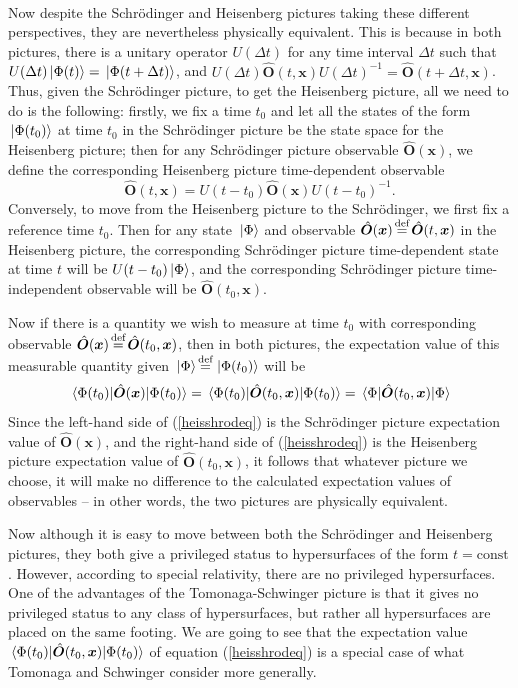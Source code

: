 \strut \\[\baselineskip] 
Now despite the Schr\"{o}dinger and Heisenberg pictures taking these different perspectives, they are nevertheless physically equivalent. This is because in both pictures, there is a unitary operator $U(\Delta t)$ for any time interval $\Delta t$ such that $U(\Delta t)\ket*{\Phi(t)}=\ket*{\Phi(t+\Delta t)}$, and $U(\Delta t)\hat{\bm{O}}(t, \bm{x})U(\Delta t)^{-1}=\hat{\bm{O}}(t+\Delta t, \bm{x})$. Thus, given the Schr\"{o}dinger picture, to get the Heisenberg picture, all we need to do is the following: firstly, we fix a time $t_0$ and let all the states of the form $\ket*{\Phi(t_0)}$ at time $t_0$ in the Schr\"{o}dinger picture be the state space for the Heisenberg picture; then for any Schr\"{o}dinger picture observable $\hat{\bm{O}}(\bm{x})$, we define the corresponding Heisenberg picture time-dependent observable 
$$\hat{\bm{O}}(t, \bm{x})=U(t-t_0)\hat{\bm{O}}(\bm{x})U(t-t_0)^{-1}.$$ 
Conversely, to move from the Heisenberg picture to the Schr\"{o}dinger, we first fix a reference time $t_0$. Then for any state $\ket*{\Phi}$ and observable $\hat{\bm{O}}(\bm{x})\myeq\hat{\bm{O}}(t, \bm{x})$ in the Heisenberg picture, the corresponding Schr\"{o}dinger picture time-dependent state at time $t$ will be $U(t-t_0)\ket*{\Phi}$, and the corresponding Schr\"{o}dinger picture time-independent observable will be $\hat{\bm{O}}(t_0, \bm{x})$.

Now if there is a quantity we wish to measure at time $t_0$ with corresponding observable $\hat{\bm{O}}(\bm{x})\myeq\hat{\bm{O}}(t_0, \bm{x})$, then in both pictures, the expectation value of this measurable quantity given $\ket*{\Phi}\myeq\ket*{\Phi(t_0)}$ will be 
\begin{equation}\label{heisshrodeq}
  \ev*{\hat{\bm{O}}(\bm{x})}{\Phi(t_0)}=\ev*{\hat{\bm{O}}(t_0,\bm{x})}{\Phi(t_0)}=\ev*{\hat{\bm{O}}(t_0, \bm{x})}{\Phi}
\end{equation}
Since the left-hand side of (\ref{heisshrodeq}) is the Schr\"{o}dinger picture expectation value of $\hat{\bm{O}}(\bm{x})$, and the right-hand side of (\ref{heisshrodeq}) is the Heisenberg picture expectation value of $\hat{\bm{O}}(t_0,\bm{x})$, it follows that whatever picture we choose, it will make no difference to the calculated expectation values of observables -- in other words, the two pictures are physically equivalent.

Now although it is easy to move between both the Schr\"{o}dinger and Heisenberg pictures, they both give a privileged status to hypersurfaces of the form $t=\text{const}$. However, according to special relativity, there are no privileged hypersurfaces. One of the advantages of the Tomonaga-Schwinger picture is that it gives no privileged status to any class of hypersurfaces, but rather all hypersurfaces are placed on the same footing. We are going to see that the expectation value $\ev*{\hat{\bm{O}}(t_0,\bm{x})}{\Phi(t_0)}$  of equation (\ref{heisshrodeq}) is a special case of what Tomonaga and Schwinger consider more generally. 

